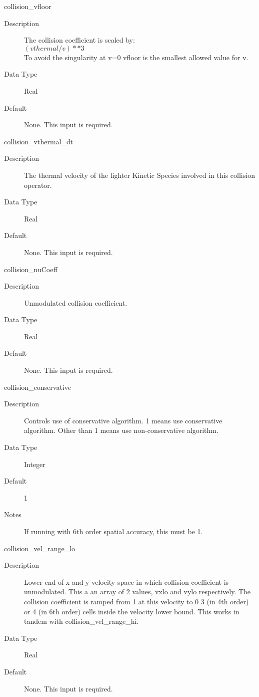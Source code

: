 \documentclass[11pt]{amsart}
\begin{document}
collision\_vfloor
\begin{description}
\item [Description] The collision coefficient is scaled by: \\
\begin{math} (vthermal/v)**3 \end{math} \\
To avoid the singularity at v=0 vfloor is the smallest allowed value for v.
\item [Data Type] Real
\item [Default] None.  This input is required.
\end{description}

collision\_vthermal\_dt
\begin{description}
\item [Description] The thermal velocity of the lighter Kinetic Species
involved in this collision operator.
\item [Data Type] Real
\item [Default] None.  This input is required.
\end{description}

collision\_nuCoeff
\begin{description}
\item [Description] Unmodulated collision coefficient.
\item [Data Type] Real
\item [Default] None.  This input is required.
\end{description}

collision\_conservative
\begin{description}
\item [Description] Controls use of conservative algorithm.  1 means use
conservative algorithm.  Other than 1 means use non-conservative algorithm.
\item [Data Type] Integer
\item [Default] 1
\item [Notes] If running with 6th order spatial accuracy, this must be 1.
\end{description}

collision\_vel\_range\_lo
\begin{description}
\item [Description] Lower end of x and y velocity space in which collision
coefficient is unmodulated.  This a an array of 2 values, vxlo and vylo
respectively.  The collision coefficient is ramped from 1 at this velocity to 0
3 (in 4th order) or 4 (in 6th order) cells inside the velocity lower bound.
This works in tandem with collision\_vel\_range\_hi.
\item [Data Type] Real
\item [Default] None.  This input is required.
\end{description}
\end{document}

